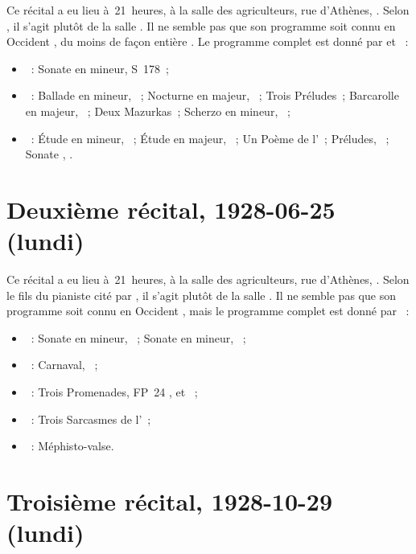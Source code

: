 Ce récital a eu lieu à~21~heures, à la salle des agriculteurs, rue
d'\hbox{Athènes}, .
Selon \citet[p.~400]{Scriabine}, il s'agit plutôt de la salle \Chopin{}.
Il ne semble pas que son programme soit connu en Occident
\citep[voir][]{White}, du moins de façon entière \citep[voir][p.~61]{Juban}.
Le programme complet est donné par \citet[p.~150]{Nekrasova08} et
\citet[p.~400]{Scriabine}~:
\begin{itemize}
 \item
 \Liszt{}~: Sonate en \kB mineur, S~178~;
 \item
 \Chopin{}~: Ballade en \kG mineur, ~; Nocturne en \kF majeur,
  ~; Trois Préludes~; Barcarolle en \kF \Sharp majeur,
 ~; Deux Mazurkas~; Scherzo en \kB \Flat mineur, ~;
 \item
 \Scriabine{}~: Étude en \kD \Sharp mineur,  ~; Étude en
 \kD \Flat majeur,  ~; Un Poème de l'~;
 Préludes, ~; Sonate , .
\end{itemize}

\section{Deuxième récital, 1928-06-25 (lundi)}
\label{rec:Paris2}

Ce récital a eu lieu à~21~heures, à la salle des agriculteurs, rue
d'\hbox{Athènes}, .
Selon le fils du pianiste cité par \citet[p.~400]{Scriabine}, il s'agit
plutôt de la salle \Chopin{}.
Il ne semble pas que son programme soit connu en Occident
\citep[voir][]{Heugel4808, White}, mais le programme complet est donné par
\citet[p.~150]{Nekrasova08}~:
\begin{itemize}
 \item
 \Beethoven{}~: Sonate  en \kC \Sharp mineur, 
 ~; Sonate  en \kF mineur, ~;
 \item
 \Schumann{}~: Carnaval, ~;
 \item
 \Poulenc{}~: Trois Promenades, FP~24 ,  et ~;
 \item
 \Prokofiev{}~: Trois Sarcasmes de l'~;
 \item
 \Liszt{}~: Méphisto-valse.
\end{itemize}

\section{Troisième récital, 1928-10-29 (lundi)}
\label{rec:Paris3}

